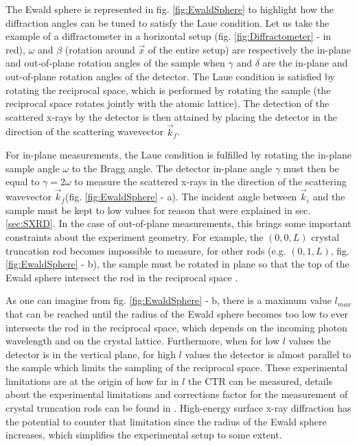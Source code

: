 The Ewald sphere is represented in fig. \ref{fig:EwaldSphere} to highlight how the diffraction angles can be tuned to satisfy the Laue condition.
Let us take the example of a diffractometer in a horizontal setup (fig. \ref{fig:Diffractometer} - in red), $\omega$ and $\beta$ (rotation around $\vec{x}$ of the entire setup) are respectively the in-plane and out-of-plane rotation angles of the sample when $\gamma$ and $\delta$ are the in-plane and out-of-plane rotation angles of the detector.
The Laue condition is satisfied by rotating the reciprocal space, which is performed by rotating the sample (the reciprocal space rotates jointly with the atomic lattice).
The detection of the scattered x-rays by the detector is then attained by placing the detector in the direction of the scattering wavevector $\vec{k}_f$.

For in-plane measurements, the Laue condition is fulfilled by rotating the in-plane sample angle $\omega$ to the Bragg angle.
The detector in-plane angle $\gamma$ must then be equal to $\gamma = 2 \omega$ to measure the scattered x-rays in the direction of the scattering wavevector $\vec{k}_f$(fig. \ref{fig:EwaldSphere} - a).
The incident angle between $\vec{k}_i$ and the sample must be kept to low values for reason that were explained in sec. \ref{sec:SXRD}.
In the case of out-of-plane measurements, this brings some important constraints about the experiment geometry.
For example, the $(0, 0, L)$ crystal truncation rod becomes impossible to measure, for other rods (e.g. $(0, 1, L)$, fig. \ref{fig:EwaldSphere} - b), the sample must be rotated in plane so that the top of the Ewald sphere intersect the rod in the reciprocal space \parencite{Vlieg1997, Schleputz2005}.

As one can imagine from fig. \ref{fig:EwaldSphere} - b, there is a maximum value $l_{max}$ that can be reached until the radius of the Ewald sphere becomes too low to ever intersects the rod in the reciprocal space, which depends on the incoming photon wavelength and on the crystal lattice.
Furthermore, when for low $l$ values the detector is in the vertical plane, for high $l$ values the detector is almost parallel to the sample which limits the sampling of the reciprocal space.
These experimental limitations are at the origin of how far in $l$ the CTR can be measured, details about the experimental limitations and corrections factor for the measurement of crystal truncation rods can be found in \cite{Vlieg1997, Drnec2014}.
High-energy surface x-ray diffraction \parencite{Gustafson2014, Harlow2020, Hejral2021} has the potential to counter that limitation since the radius of the Ewald sphere increases, which simplifies the experimental setup to some extent.


